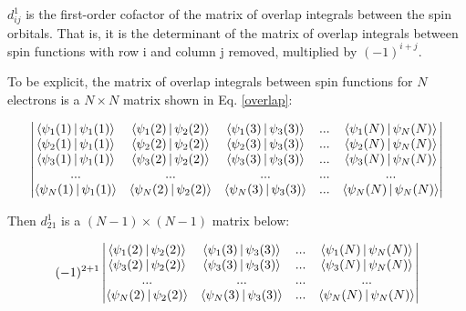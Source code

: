 \documentclass[a4paper]{article}
\begin{document}
    $d^1_{ij}$ is the first-order cofactor of the matrix of overlap integrals                                                                                                                                  
    between the spin orbitals. That is, it is the determinant of the                                                                                                                                 
    matrix of overlap integrals between spin functions with row i and column j removed, multiplied by $(-1)^{i+j}$.                                                                                                                                          

To be explicit, the matrix of overlap integrals between spin functions for $N$ electrons is a $N \times N$ matrix shown in Eq. \ref{overlap}:

\begin{equation}
 \begin{aligned}
    \begin{vmatrix} 
    \Braket{ \psi_1(1)| \psi_1(1) }  &  \Braket{ \psi_1(2) | \psi_2(2) } & \Braket{ \psi_1(3) | \psi_3(3) } & ... &  \Braket{ \psi_1(N) | \psi_N(N) } \\
    \Braket{ \psi_2(1) |\psi_1(1) }  &  \Braket{ \psi_2(2) | \psi_2(2) } & \Braket{ \psi_2(3) | \psi_3(3) } & ... &  \Braket{ \psi_2(N) | \psi_N(N) } \\
    \Braket{ \psi_3(1)|  \psi_1(1) }  &  \Braket{ \psi_3(2) | \psi_2(2) } & \Braket{ \psi_3(3) | \psi_3(3) } &... &  \Braket{ \psi_3(N) | \psi_N(N) } \\
    ... & ... & ... & ...& ...\\
     \Braket{ \psi_N(1)|  \psi_1(1) } &  \Braket{ \psi_N(2)|  \psi_2(2) }& \Braket{ \psi_N(3) | \psi_3(3) } & ...&  \Braket{ \psi_N(N) | \psi_N(N) }\\
    \end{vmatrix}
    \label{overlap}
         \end{aligned}
     \end{equation}

Then $d^1_{21}$ is a $(N-1) \times (N-1)$ matrix below:

\begin{equation}
 \begin{aligned}
   (-1)^{2+1} \begin{vmatrix} 
    \Braket{ \psi_1(2) | \psi_2(2) } & \Braket{ \psi_1(3) | \psi_3(3) } & ... &  \Braket{ \psi_1(N) | \psi_N(N) } \\
      \Braket{ \psi_3(2) | \psi_2(2) } & \Braket{ \psi_3(3) | \psi_3(3) } &... &  \Braket{ \psi_3(N) | \psi_N(N) } \\
     ... & ... & ...& ...\\
      \Braket{ \psi_N(2)|  \psi_2(2) }& \Braket{ \psi_N(3) | \psi_3(3) } & ...&  \Braket{ \psi_N(N) | \psi_N(N) }\\
    \end{vmatrix}
    \label{cof}
         \end{aligned}
     \end{equation}
\end{document}
